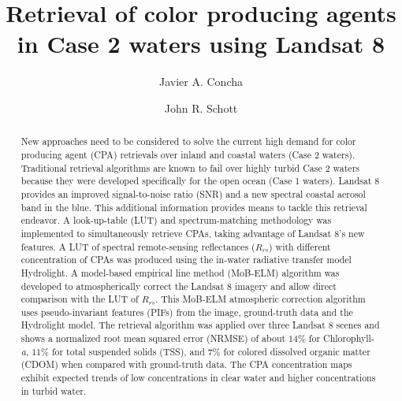 \documentclass[onecolumn,3p,letterpaper]{elsarticle}
\begin{document}

\begin{frontmatter}

\title{Retrieval of color producing agents in Case 2 waters using Landsat 8}


\author[mymainaddress]{Javier A. Concha}

\author[mymainaddress]{John R. Schott}
\address[mymainaddress]{Rochester Institute of Technology (RIT), NY 14623, USA}
\begin{abstract}

New approaches need to be considered to solve the current high demand for color producing agent (CPA) retrievals over inland and coastal waters (Case 2 waters). 
%
Traditional retrieval algorithms are known to fail over highly turbid Case 2 waters because they were developed specifically for the open ocean (Case 1 waters). 
%
Landsat 8 provides an improved signal-to-noise ratio (SNR) and a new spectral coastal aerosol band in the blue. 
%
This additional information provides means to tackle this retrieval endeavor. 
A look-up-table (LUT) and spectrum-matching methodology was implemented to simultaneously retrieve CPAs, taking advantage of Landsat 8's new features. 
%
A LUT of spectral remote-sensing reflectances ($R_{rs}$) with different concentration of CPAs was produced using the in-water radiative transfer model Hydrolight. 
%
A model-based empirical line method (MoB-ELM) algorithm was developed to atmospherically correct the Landsat 8 imagery and allow direct comparison with the LUT of $R_{rs}$. 
%
This MoB-ELM atmospheric correction algorithm uses pseudo-invariant features (PIFs) from the image, ground-truth data and the Hydrolight model.
The retrieval algorithm was applied over three Landsat 8 scenes and shows a normalized root mean squared error (NRMSE) of about $14\%$ for Chlorophyll-{\it a}, $11\%$ for total suspended solids (TSS), and $7\%$ for colored dissolved organic matter (CDOM) when compared with ground-truth data. The CPA concentration maps exhibit expected trends of low concentrations in clear water and higher concentrations in turbid water.


\end{abstract}
\end{frontmatter}
\end{document}
